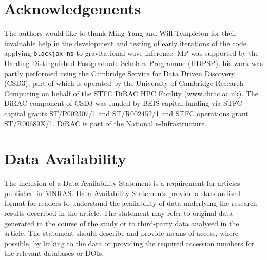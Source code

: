 \documentclass[fleqn,usenatbib]{mnras}
\begin{document}
\section*{Acknowledgements}

The authors would like to thank Ming Yang and Will Templeton for their
invaluable help in the development and testing of early iterations of 
the code applying \texttt{blackjax ns} to gravitational-wave inference.
MP was supported by the Harding Distinguished Postgraduate Scholars Programme (HDPSP). 
his work was partly performed using the Cambridge Service for Data Driven Discovery (CSD3), 
part of which is operated by the University of Cambridge Research Computing on behalf of the
STFC DiRAC HPC Facility (www.dirac.ac.uk). The DiRAC component of CSD3 was funded by BEIS 
capital funding via STFC capital grants ST/P002307/1 and ST/R002452/1 and STFC operations 
grant ST/R00689X/1. DiRAC is part of the National e-Infrastructure.

\section*{Data Availability}

 
The inclusion of a Data Availability Statement is a requirement for articles published in MNRAS. Data Availability Statements provide a standardised format for readers to understand the availability of data underlying the research results described in the article. The statement may refer to original data generated in the course of the study or to third-party data analysed in the article. The statement should describe and provide means of access, where possible, by linking to the data or providing the required accession numbers for the relevant databases or DOIs.









\end{document}
